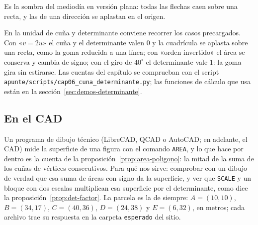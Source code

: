 Es la sombra del mediodía en versión plana: todas las flechas caen sobre una recta, y las de
una dirección se aplastan en el origen.

En la unidad de cuña y determinante conviene recorrer los casos precargados. Con
«\(v = 2u\)» el cuña y el determinante valen \(0\) y la cuadrícula se aplasta sobre una recta,
como la goma reducida a una línea; con «orden invertido» el área se conserva y cambia de
signo; con el giro de \(40^\circ\) el determinante vale \(1\): la goma gira sin estirarse. Las
cuentas del capítulo se comprueban con el script
\texttt{apunte/scripts/cap06\_cuna\_determinante.py}; las funciones de cálculo que usa están
en la sección~\ref{sec:demos-determinante}.

\subsection{En el CAD}\label{sec:cad-cap06}

Un programa de dibujo técnico (LibreCAD, QCAD o AutoCAD; en adelante, el CAD) mide la
superficie de una figura con el comando \texttt{AREA}, y lo que hace por dentro es la cuenta de
la proposición~\ref{prop:area-poligono}: la mitad de la suma de los cuñas de vértices
consecutivos. Para qué nos sirve: comprobar con un dibujo de verdad que esa suma de áreas con
signo da la superficie, y ver que \texttt{SCALE} y un bloque con dos escalas multiplican esa
superficie por el determinante, como dice la proposición~\ref{prop:det-factor}. La parcela es
la de siempre: \(A=(10,10)\), \(B=(34,17)\), \(C=(40,36)\), \(D=(24,38)\) y \(E=(6,32)\), en
metros; cada archivo trae su respuesta en la carpeta \texttt{esperado} del sitio.

